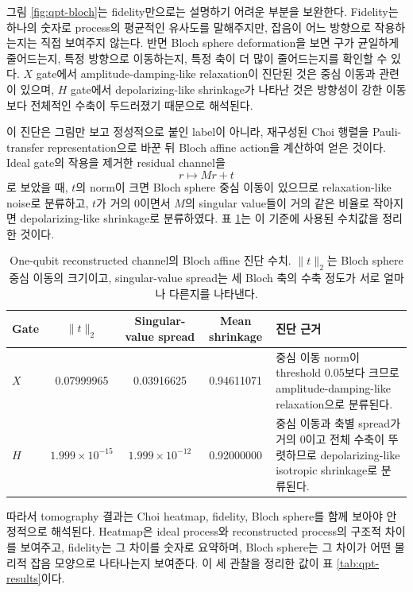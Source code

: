 \documentclass[11pt,a4paper]{article}
\begin{document}
그림 \ref{fig:qpt-bloch}는 fidelity만으로는 설명하기 어려운 부분을 보완한다. Fidelity는 하나의 숫자로 process의 평균적인 유사도를 말해주지만, 잡음이 어느 방향으로 작용하는지는 직접 보여주지 않는다. 반면 Bloch sphere deformation을 보면 구가 균일하게 줄어드는지, 특정 방향으로 이동하는지, 특정 축이 더 많이 줄어드는지를 확인할 수 있다. $X$ gate에서 amplitude-damping-like relaxation이 진단된 것은 중심 이동과 관련이 있으며, $H$ gate에서 depolarizing-like shrinkage가 나타난 것은 방향성이 강한 이동보다 전체적인 수축이 두드러졌기 때문으로 해석된다.

이 진단은 그림만 보고 정성적으로 붙인 label이 아니라, 재구성된 Choi 행렬을 Pauli-transfer representation으로 바꾼 뒤 Bloch affine action을 계산하여 얻은 것이다. Ideal gate의 작용을 제거한 residual channel을
\[
r\mapsto Mr+t
\]
로 보았을 때, $t$의 norm이 크면 Bloch sphere 중심 이동이 있으므로 relaxation-like noise로 분류하고, $t$가 거의 0이면서 $M$의 singular value들이 거의 같은 비율로 작아지면 depolarizing-like shrinkage로 분류하였다. 표 \ref{tab:qpt-bloch-diagnostics}는 이 기준에 사용된 수치값을 정리한 것이다.

\begin{table}[H]
\centering
\small
\begin{tabularx}{\textwidth}{lcccX}
\toprule
Gate & $\|t\|_2$ & Singular-value spread & Mean shrinkage & 진단 근거 \\
\midrule
$X$ & 0.07999965 & 0.03916625 & 0.94611071 & 중심 이동 norm이 threshold 0.05보다 크므로 amplitude-damping-like relaxation으로 분류된다. \\
$H$ & $1.999\times10^{-15}$ & $1.999\times10^{-12}$ & 0.92000000 & 중심 이동과 축별 spread가 거의 0이고 전체 수축이 뚜렷하므로 depolarizing-like isotropic shrinkage로 분류된다. \\
\bottomrule
\end{tabularx}
\caption{One-qubit reconstructed channel의 Bloch affine 진단 수치. $\|t\|_2$는 Bloch sphere 중심 이동의 크기이고, singular-value spread는 세 Bloch 축의 수축 정도가 서로 얼마나 다른지를 나타낸다.}
\label{tab:qpt-bloch-diagnostics}
\end{table}

따라서 tomography 결과는 Choi heatmap, fidelity, Bloch sphere를 함께 보아야 안정적으로 해석된다. Heatmap은 ideal process와 reconstructed process의 구조적 차이를 보여주고, fidelity는 그 차이를 숫자로 요약하며, Bloch sphere는 그 차이가 어떤 물리적 잡음 모양으로 나타나는지 보여준다. 이 세 관찰을 정리한 값이 표 \ref{tab:qpt-results}이다.
\end{document}
